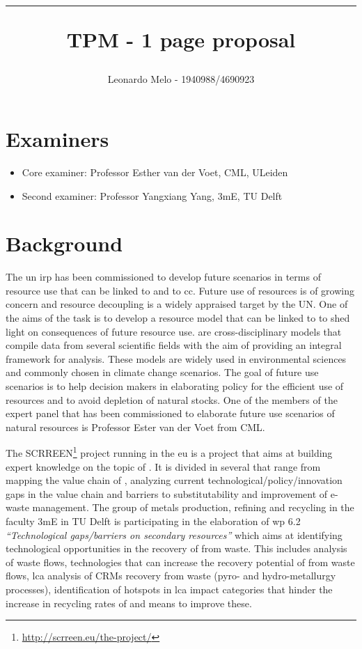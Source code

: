 \documentclass{article}
\title{\rule{\textwidth}{1.3px}
\vspace{0.4cm}
\bf{TPM - 1 page proposal}}
\author{Leonardo Melo - 1940988/4690923}
\date{\today\vspace{0.1cm}
\rule{\textwidth}{1.3px}}
\begin{document}
\maketitle


\section*{Examiners}
\begin{itemize}
    \item Core examiner: Professor Esther van der Voet, CML, ULeiden
    \item Second examiner: Professor Yangxiang Yang, 3mE, TU Delft
\end{itemize}

\section*{Background}
The \acrfull{un} \acrfull{irp} has been commissioned to develop future scenarios in terms of resource use that can be linked to  and to \acrfull{cc}. Future use of resources is of growing concern and resource decoupling is a widely appraised target by the UN. One of the aims of the task is to develop a resource model that can be linked to  to shed light on consequences of future resource use.  are cross-disciplinary models that compile data from several scientific fields with the aim of providing an integral framework for analysis. These models are widely used in environmental sciences and commonly chosen in climate change scenarios. The goal of future use scenarios is to help decision makers in elaborating policy for the efficient use of resources and to avoid depletion of natural stocks. One of the members of the expert panel that has been commissioned to elaborate future use scenarios of natural resources is Professor Ester van der
Voet from CML.


The SCRREEN\footnote{\url{http://scrreen.eu/the-project/}} project running in the \acrshort{eu} is a project that aims at building expert knowledge on the topic of . It is divided in several  that range from mapping the value chain of , analyzing current technological/policy/innovation gaps in the value chain and barriers to substitutability and improvement of e-waste management. The group of metals production, refining and recycling in the faculty 3mE in TU Delft is participating in the elaboration of \acrshort{wp} 6.2 \textit{“Technological gaps/barriers on secondary resources”} which aims at identifying technological opportunities in the recovery of  from waste. This includes analysis of waste flows, technologies that can increase the recovery potential of  from waste flows, \acrfull{lca} analysis of CRMs recovery from waste (pyro- and hydro-metallurgy processes), identification of hotspots in \acrshort{lca} impact categories that hinder the increase in recycling rates of  and means to improve these.
\end{document}
